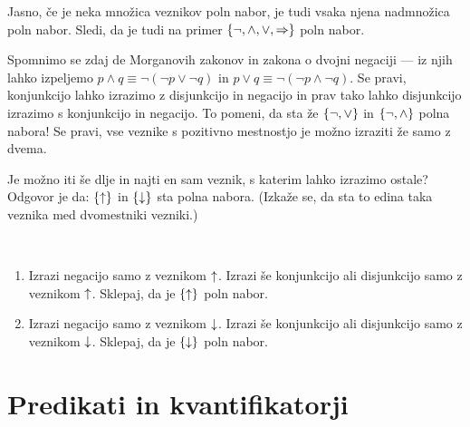 		Jasno, če je neka množica veznikov poln nabor, je tudi vsaka njena nadmnožica poln nabor. Sledi, da je tudi na primer $\set{\lnot, \land, \lor, \impl}$ poln nabor.
		
		Spomnimo se zdaj de Morganovih zakonov in zakona o dvojni negaciji --- iz njih lahko izpeljemo $p \land q \equiv \lnot(\lnot{p} \lor \lnot{q})$ in $p \lor q \equiv \lnot(\lnot{p} \land \lnot{q})$. Se pravi, konjunkcijo lahko izrazimo z disjunkcijo in negacijo in prav tako lahko disjunkcijo izrazimo s konjunkcijo in negacijo. To pomeni, da sta že $\set{\lnot, \lor}$ in $\set{\lnot, \land}$ polna nabora! Se pravi, vse veznike s pozitivno mestnostjo je možno izraziti že samo z dvema.
		
		Je možno iti še dlje in najti en sam veznik, s katerim lahko izrazimo ostale? Odgovor je da: $\set{\shf}$ in $\set{\luk}$ sta polna nabora. (Izkaže se, da sta to edina taka veznika med dvomestniki vezniki.)
		
		\begin{vaja}\label{VAJA: polni nabori z enim veznikom}
			\
			\begin{enumerate}
				\item
					Izrazi negacijo samo z veznikom $\mathbin{\uparrow}$. Izrazi še konjunkcijo ali disjunkcijo samo z veznikom $\mathbin{\uparrow}$. Sklepaj, da je $\set{\shf}$ poln nabor.
				\item
					Izrazi negacijo samo z veznikom $\mathbin{\downarrow}$. Izrazi še konjunkcijo ali disjunkcijo samo z veznikom $\mathbin{\downarrow}$. Sklepaj, da je $\set{\luk}$ poln nabor.
			\end{enumerate}
		\end{vaja}
		
	
	
	\section{Predikati in kvantifikatorji}
	

